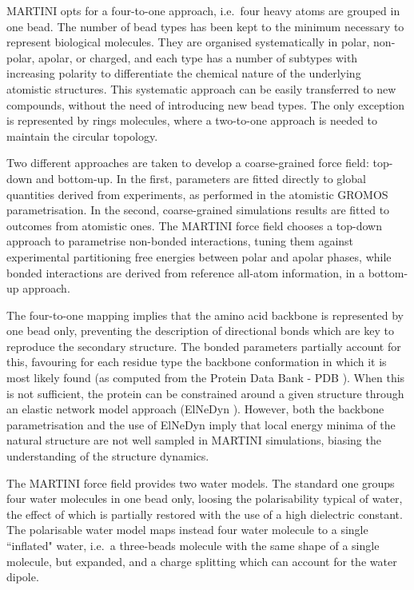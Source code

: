 \documentclass[graybox]{svmult}
\begin{document}
MARTINI opts for a four-to-one approach, i.e.\ four heavy atoms are grouped in one bead. The number of bead types has been kept to the minimum necessary to represent biological molecules. They are organised systematically in polar, non-polar, apolar, or charged, and each type has a number of subtypes with increasing polarity to differentiate the chemical nature of the underlying atomistic structures.
%
This systematic approach can be easily transferred to new compounds, without the need of introducing new bead types.
%
The only exception is represented by rings molecules, where a two-to-one approach is needed to maintain the circular topology.

Two different approaches are taken to develop a coarse-grained force field: top-down and bottom-up. In the first, parameters are fitted directly to global quantities derived from experiments, as performed in the atomistic GROMOS parametrisation. In the second, coarse-grained simulations results are fitted to outcomes from atomistic ones.
%
The MARTINI force field chooses a top-down approach to parametrise non-bonded interactions, tuning them against experimental partitioning free energies between polar and apolar phases, while bonded interactions are derived from reference all-atom information, in a bottom-up approach.

The four-to-one mapping implies that the amino acid backbone is represented by one bead only, preventing the description of directional bonds which are key to reproduce the secondary structure. The bonded parameters partially account for this, favouring for each residue type the backbone conformation in which it is most likely found (as computed from the Protein Data Bank - PDB \cite{PDB}). When this is not sufficient, the protein can be constrained around a given structure through an elastic network model approach (ElNeDyn \cite{Periole2009}). However, both the backbone parametrisation and the use of ElNeDyn imply that local energy minima of the natural structure are not well sampled in MARTINI simulations, biasing the understanding of the structure dynamics.

The MARTINI force field provides two water models. The standard one groups four water molecules in one bead only, loosing the polarisability typical of water, the effect of which is partially restored with the use of a high dielectric constant. The polarisable water model \cite{Yesylevskyy2010} maps instead four water molecule to a single ``inflated" water, i.e.\ a three-beads molecule with the same shape of a single molecule, but expanded, and a charge splitting which can account for the water dipole.
\end{document}
